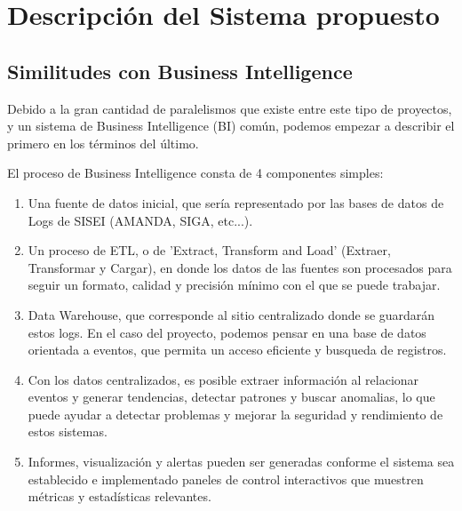 
\section{Descripción del Sistema propuesto}

\subsection{Similitudes con Business Intelligence}

Debido a la gran cantidad de paralelismos que existe entre este tipo de proyectos, y un sistema de Business Intelligence (BI) común, podemos empezar a describir el primero en los términos del último.


El proceso de Business Intelligence consta de 4 componentes simples:

\begin{enumerate}
  \item Una fuente de datos inicial, que sería representado por las bases de datos de Logs de SISEI (AMANDA, SIGA, etc...).
  \item Un proceso de ETL, o de 'Extract, Transform and Load' (Extraer, Transformar y Cargar), en donde los datos de las fuentes son procesados para seguir un formato, calidad y precisión mínimo con el que se puede trabajar.
  \item Data Warehouse, que corresponde al sitio centralizado donde se guardarán estos logs. En el caso del proyecto, podemos pensar en una base de datos orientada a eventos, que permita un acceso eficiente y busqueda de registros.
  \item Con los datos centralizados, es posible extraer información al relacionar eventos y generar tendencias, detectar patrones y buscar anomalias, lo que puede ayudar a detectar problemas y mejorar la seguridad y rendimiento de estos sistemas.
  \item Informes, visualización y alertas pueden ser generadas conforme el sistema sea establecido e implementado paneles de control interactivos que muestren métricas y estadísticas relevantes.
\end{enumerate}

